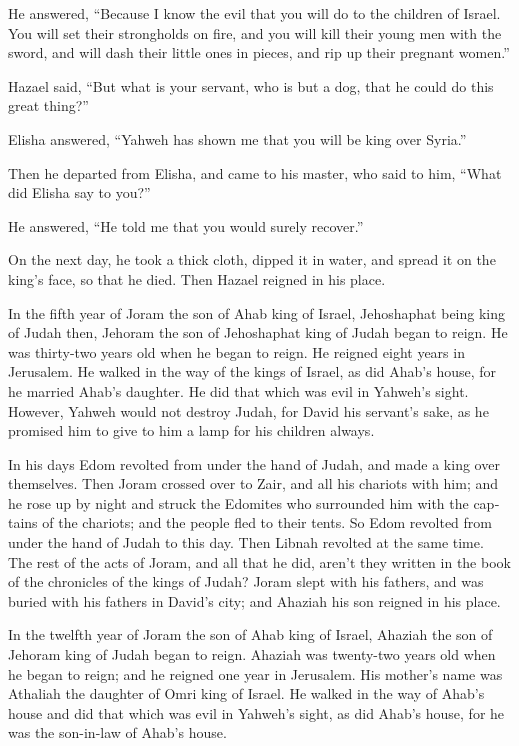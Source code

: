 \begin{paracol}{2}
\begin{otherlanguage}{english}
He answered, ``Because I know the evil that you will do to the children
of Israel. You will set their strongholds on fire, and you will kill
their young men with the sword, and will dash their little ones in
pieces, and rip up their pregnant women.''

 Hazael said, ``But what is your servant, who is but a
dog, that he could do this great thing?''

Elisha answered, ``Yahweh has shown me that you will be king over
Syria.''

 Then he departed from Elisha, and came to his master,
who said to him, ``What did Elisha say to you?''

He answered, ``He told me that you would surely recover.''

 On the next day, he took a thick cloth, dipped it in
water, and spread it on the king's face, so that he died. Then Hazael
reigned in his place.

 In the fifth year of Joram the son of Ahab king of
Israel, Jehoshaphat being king of Judah then, Jehoram the son of
Jehoshaphat king of Judah began to reign.  He was
thirty-two years old when he began to reign. He reigned eight years in
Jerusalem.  He walked in the way of the kings of Israel,
as did Ahab's house, for he married Ahab's daughter. He did that which
was evil in Yahweh's sight.  However, Yahweh would not
destroy Judah, for David his servant's sake, as he promised him to give
to him a lamp for his children always.

 In his days Edom revolted from under the hand of Judah,
and made a king over themselves.  Then Joram crossed over
to Zair, and all his chariots with him; and he rose up by night and
struck the Edomites who surrounded him with the captains of the
chariots; and the people fled to their tents.  So Edom
revolted from under the hand of Judah to this day. Then Libnah revolted
at the same time.  The rest of the acts of Joram, and all
that he did, aren't they written in the book of the chronicles of the
kings of Judah?  Joram slept with his fathers, and was
buried with his fathers in David's city; and Ahaziah his son reigned in
his place.

 In the twelfth year of Joram the son of Ahab king of
Israel, Ahaziah the son of Jehoram king of Judah began to reign.
 Ahaziah was twenty-two years old when he began to reign;
and he reigned one year in Jerusalem. His mother's name was Athaliah the
daughter of Omri king of Israel.  He walked in the way of
Ahab's house and did that which was evil in Yahweh's sight, as did
Ahab's house, for he was the son-in-law of Ahab's house.


\end{otherlanguage}
\end{paracol}
